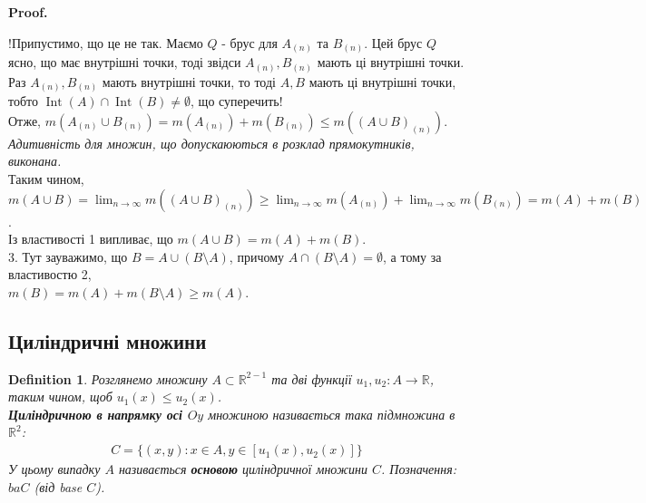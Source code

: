 \documentclass[a4paper, 10pt]{article}
\makeatletter
\def\qed{$\blacksquare$}
\theoremstyle{theoremdd}
\theoremstyle{theoremdd}
\newtheorem{definition}[theorem]{Definition}
\theoremstyle{theoremdd}
\theoremstyle{theoremdd}
\theoremstyle{theoremdd}
\theoremstyle{theoremdd}
\theoremstyle{theoremdd}
\theoremstyle{theoremdd}
\renewenvironment{proof}[1][Proof.\\]{\par
\pushQED{\hfill \qed}%
\normalfont \topsep6\p@\@plus6\p@\relax
\trivlist
\item\relax
{\bfseries
#1\@addpunct{.}}\hspace\labelsep\ignorespaces
}{%
\popQED\endtrivlist\@endpefalse
}
\DeclareMathOperator{\Int}{Int}
\makeatother
\begin{document}
\begin{proof}
!Припустимо, що це не так. Маємо $Q$ - брус для $A_{(n)}$ та $B_{(n)}$. Цей брус $Q$ ясно, що має внутрішні точки, тоді звідси $A_{(n)}, B_{(n)}$ мають ці внутрішні точки. Раз $A_{(n)},B_{(n)}$ мають внутрішні точки, то тоді $A,B$ мають ці внутрішні точки, тобто $\Int(A) \cap \Int(B) \neq \emptyset$, що суперечить!\\
Отже, $m(A_{(n)} \cup B_{(n)}) = m(A_{(n)}) + m(B_{(n)}) \leq m((A \cup B)_{(n)})$.\\
\textit{Адитивність для множин, що допускаюються в розклад прямокутників, виконана.}\\
Таким чином, $m(A \cup B) = \displaystyle\lim_{n \to \infty} m((A \cup B)_{(n)}) \geq \lim_{n \to \infty} m(A_{(n)}) + \lim_{n \to \infty} m(B_{(n)}) = m(A) + m(B)$.\\
Із властивості 1 випливає, що $m(A \cup B) = m(A) + m(B)$.
\bigskip \\
3. Тут зауважимо, що $B = A \cup (B \setminus A)$, причому $A \cap (B \setminus A) = \emptyset$, а тому за властивостю 2,\\
$m(B) = m(A) + m(B \setminus A) \geq m(A)$.
\end{proof}

\subsection{Циліндричні множини}
\begin{definition}
Розглянемо множину $A \subset \mathbb{R}^{2-1}$ та дві функції $u_1,u_2: A \to \mathbb{R}$, таким чином, щоб $u_1(x) \leq u_2(x)$.\\
\textbf{Циліндричною в напрямку осі $Oy$} множиною називається така підмножина в $\mathbb{R}^2$:
\begin{align*}
C = \{ (x,y): x \in A, y \in [u_1(x),u_2(x)] \}
\end{align*}
У цьому випадку $A$ називається \textbf{основою} циліндричної множини $C$. Позначення: $ba C$ (від base $C$).
\begin{figure}[H]
\centering
{}
\end{figure}
\end{definition}
\end{document}
